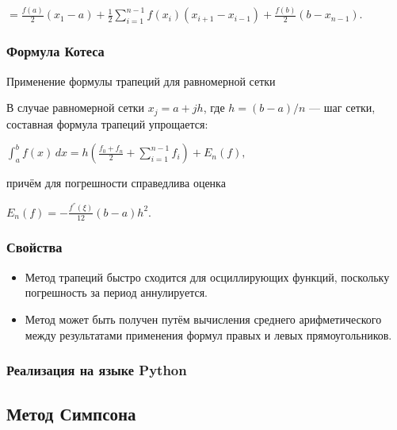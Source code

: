 \documentclass[a4paper]{article}
\begin{document}
{{{{{{{{\begin{center}
{{\(= \frac{f(a)}{2}(x_{1} - a) + \frac{1}{2}\sum\limits_{i = 1}^{n - 1}{f(x_{i})}(x_{i + 1} - x_{i - 1}) + \frac{f(b)}{2}(b - x_{n - 1}).\)}}
\end{center}

\subsubsection{Формула Котеса}

Применение формулы трапеций для равномерной сетки

В случае равномерной сетки {{\(x_{j} = a + jh\)}}, где
{{\(h = (b - a)/n\)}} --- шаг сетки, составная формула трапеций
упрощается:

\begin{center}
 {{\(\int_{a}^{b}f(x)\, dx = h\left( {\frac{f_{0} + f_{n}}{2} + \sum\limits_{i = 1}^{n - 1}f_{i}} \right) + E_{n}(f),\)}}
\end{center}

причём для погрешности справедлива оценка

\begin{center}
 {{\(E_{n}(f) = - \frac{f^{''}(\xi)}{12}(b - a)h^{2}.\)}}
\end{center}

\subsubsection{Свойства}

\begin{itemize}
\item
  Метод трапеций быстро сходится для осциллирующих функций, поскольку
  погрешность за период аннулируется.
\item
  Метод может быть получен путём вычисления среднего арифметического
  между результатами применения формул правых и левых прямоугольников.
\end{itemize}

\subsubsection{Реализация на языке Python}



\newpage
\subsection{Метод Симпсона}

}}}}}}}}
\end{document}
